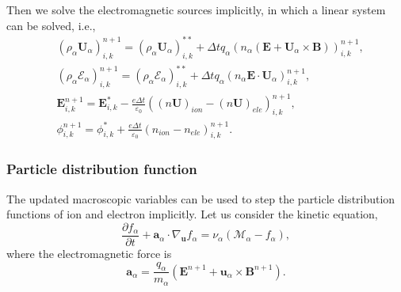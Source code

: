\documentclass[preprint,3p,12pt,sort&compress]{elsarticle}
\begin{document}
Then we solve the electromagnetic sources implicitly,
in which a linear system can be solved, i.e.,
\begin{equation}
\begin{aligned}
& (\rho_\alpha \mathbf U_\alpha)^{n+1}_{i,k} = (\rho_\alpha \mathbf U_\alpha)^{**}_{i,k}
+ \Delta t q_\alpha \left( n_\alpha (\mathbf E+\mathbf U_\alpha \times \mathbf B) \right)_{i,k}^{n+1}, \\
& (\rho_\alpha \mathscr E_\alpha)_{i,k}^{n+1}  = (\rho_\alpha \mathscr E_\alpha)_{i,k}^{**}
+ \Delta t q_\alpha (n_\alpha \mathbf E \cdot \mathbf U_\alpha)_{i,k}^{n+1}, \\
&{\mathbf{E}}_{i,k}^{n+1}={\mathbf{E}}_{i,k}^{*}
-\frac{e \Delta t}{\varepsilon_0}\left( {( n \mathbf U)}_{ion} - {( n \mathbf U)}_{ele} \right)^{n+1}_{i,k}, \\
&{{\phi}}_{i,k}^{n+1}={{\phi}}_{i,k}^{*} 
+\frac{e \Delta t}{\varepsilon_0}\left({n}_{ion}-{n}_{ele} \right)^{n+1}_{i,k} .
\end{aligned}
\label{eqn:em source}
\end{equation}

\subsubsection{Particle distribution function}

The updated macroscopic variables can be used to step the particle distribution functions of ion and electron implicitly.
Let us consider the kinetic equation,
\begin{equation}
\frac{\partial f_{\alpha}}{\partial t}+ \mathbf a_\alpha \cdot \nabla_{\mathbf{u}} f_{\alpha}=\nu_\alpha (\mathcal M_\alpha - f_\alpha),
\label{eqn:force bgk}
\end{equation}
where the electromagnetic force is 
\begin{equation*}
\mathbf a_\alpha=\frac{q_{\alpha}}{m_{\alpha}}\left(\mathbf{E}^{n+1}+\mathbf{u}_{\alpha} \times \mathbf{B}^{n+1}\right).
\end{equation*}
\end{document}
